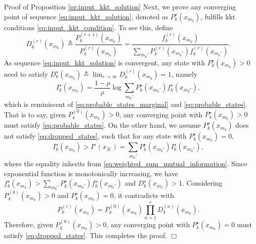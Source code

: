 \documentclass[journal]{IEEEtran}
\renewcommand{\qedsymbol}{\hfill\ensuremath{\Box}}
\begin{document}
\begin{appendix}
\begin{subsection}{Proof of Proposition \ref{pr:input_kkt_solution}}
		Next, we prove any converging point of sequence \eqref{eq:input_kkt_solution}, denoted as $P_k^\star(x_{m_k})$, fulfills \gls{kkt} conditions \eqref{eq:input_kkt_condition}.
		To see this, define
		\begin{equation}
			D_k^{(r)}(x_{m_k}) \triangleq \frac{P_k^{(r+1)}(x_{m_k})}{P_k^{(r)}(x_{m_k})} = \frac{f_k^{(r)}(x_{m_k})}{\sum_{m_k'} P_k^{(r)}(x_{m_k'}) f_k^{(r)}(x_{m_k'})}.
		\end{equation}
		As sequence \eqref{eq:input_kkt_solution} is convergent, any state with $P_k^\star(x_{m_k}) > 0$ need to satisfy $D_k^\star(x_{m_k}) \triangleq \lim_{r \to \infty} D_k^{(r)}(x_{m_k}) = 1$, namely
		\begin{equation}
			I_k^\star(x_{m_k}) = \frac{1 - \rho}{\rho} \log \sum_{m_k'} P_k^\star(x_{m_k'}) f_k^\star(x_{m_k'}),
		\end{equation}
		which is reminiscent of \eqref{eq:probable_states_marginal} and \eqref{eq:probable_states}.
		That is to say, given $P_k^{(0)}(x_{m_k}) > 0$, any converging point with $P_k^\star(x_{m_k}) > 0$ must satisfy \eqref{eq:probable_states}.
		On the other hand, we assume $P_k^\star(x_{m_k})$ does not satisfy \eqref{eq:dropped_states}, such that for any state with $P_k^\star(x_{m_k}) = 0$,
		\begin{equation}
			I_k^\star(x_{m_k}) > I^\star(x_{\mathcal{K}}) = \sum_{m_k'} P_k^\star(x_{m_k'}) I_k^\star(x_{m_k'}),
		\end{equation}
		where the equality inherits from \eqref{eq:weighted_sum_mutual_information}.
		Since exponential function is monotonically increasing, we have $f_k^\star(x_{m_k}) > \sum_{m_k'} P_k^\star(x_{m_k'}) f_k^\star(x_{m_k'})$ and $D_k^\star(x_{m_k}) > 1$.
		Considering $P_k^{(0)}(x_{m_k}) > 0$ and $P_k^\star(x_{m_k}) = 0$, it contradicts with
		\begin{equation}
			P_k^{(r)}(x_{m_k}) = P_k^{(0)}(x_{m_k}) \prod_{n=1}^r D_k^{(n)}(x_{m_k}).
		\end{equation}
		Therefore, given $P_k^{(0)}(x_{m_k}) > 0$, any converging point with $P_k^\star(x_{m_k}) = 0$ must satisfy \eqref{eq:dropped_states}.
		This completes the proof.
		\qedsymbol
		\label{ap:input_kkt_solution}
	\end{subsection}


\end{appendix}
\end{document}
